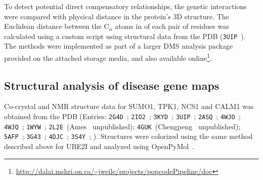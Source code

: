 To detect potential direct compensatory relationships, the genetic interactions were compared with physical distance in the protein's 3D structure. The Euclidean distance between the C$_\alpha$ atoms in of each pair of residues was calculated using a custom script using structural data from the PDB (\texttt{3UIP}~\cite{gareau_determinants_2012}).
The methods were implemented as part of a larger DMS analysis package provided on the attached storage media, and also available online\footnote{\url{http://dalai.mshri.on.ca/~jweile/projects/popcodePipeline/doc}}.



\subsection{Structural analysis of disease gene maps}
Co-crystal and NMR structure data for SUMO1, TPK1, NCS1 and CALM1 was obtained from the PDB (Entries: \texttt{2G4D}~\cite{xu_crystal_2006}; \texttt{2IO2}~\cite{reverter_structural_2006}; \texttt{3KYD}~\cite{olsen_active_2010}; \texttt{3UIP}~\cite{gareau_determinants_2012}; \texttt{2ASQ}~\cite{song_small_2005}; \texttt{4WJO}~\cite{cappadocia_structural_2015-1}; \texttt{4WJQ}~\cite{cappadocia_structural_2015-1}; \texttt{1WYW}~\cite{baba_crystal_2005}; 
\texttt{2L2E}~(Ames \etal\ unpublished); \texttt{4GUK}~(Chengpeng \etal\ unpublished); \texttt{5AFP}~\cite{pandalaneni_neuronal_2015}; 
\texttt{3G43}~\cite{fallon_crystal_2009}; \texttt{4DJC}~\cite{sarhan_crystallographic_2012}; 
\texttt{3S4Y}~\cite{timm_crystal_2001}; ). Structures were colorized using the same method described above for UBE2I and analyzed using OpenPyMol~\cite{schrodinger_pymol_2016}.



